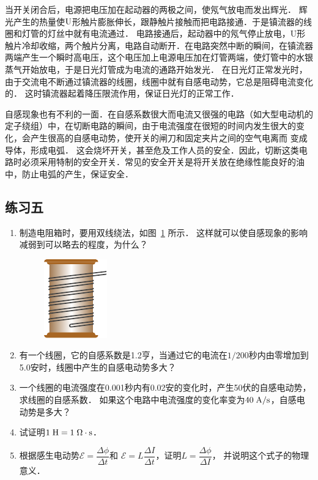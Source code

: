 当开关闭合后，电源把电压加在起动器的两极之间，使氖气放电而发出辉光．
辉光产生的热量使$\rm{U}$形触片膨胀伸长，跟静触片接触而把电路接通．于是镇流器的线圈和灯管的灯丝中就有电流通过．
电路接通后，起动器中的氖气停止放电，U形触片冷却收缩，两个触片分离，电路自动断开．在电路突然中断的瞬间，在镇流器两端产生一个瞬时高电压，这个电压加上电源电压加在灯管两端，使灯管中的水银蒸气开始放电，于是日光灯管成为电流的通路开始发光．
在日光灯正常发光时，由于交流电不断通过镇流器的线圈，线圈中就有自感电动势，它总是阻碍电流变化的．
这时镇流器起着降压限流作用，保证日光灯的正常工作．

自感现象也有不利的一面．在自感系数很大而电流又很强的电路（如大型电动机的定子绕组）中，在切断电路的瞬间，由于电流强度在很短的时间内发生很大的变化，会产生很高的自感电动势，使开关的闸刀和固定夹片之间的空气电离而
变成导体，形成电弧．
这会烧坏开关，甚至危及工作人员的安全．因此，切断这类电路时必须采用特制的安全开关．常见的安全开关是将开关放在绝缘性能良好的油中，防止电弧的产生，保证安全．

\subsection*{练习五}
\begin{enumerate}
    \item 制造电阻箱时，要用双线绕法，如图~\ref{fig_C_2-29} 所示．
    这样就可以使自感现象的影响减弱到可以略去的程度，为什么？
    \begin{figure}[htbp]
        \centering
        \includegraphics{fig/C/2-29.pdf}
        \caption{}\label{fig_C_2-29}
    \end{figure}

    \item 有一个线圈，它的自感系数是1.2亨，当通过它的电流在$1/200$秒内由零增加到5.0安时，线圈中产生的自感电动势多大？
    \item 一个线圈的电流强度在0.001秒内有0.02安的变化时，产生50伏的自感电动势，求线圈的自感系数．
    如果这个电路中电流强度的变化率变为$40 \;\text{A}/\text{s} $，自感电动势是多大？
    \item 试证明$1\;\text{H}=1\;\Omega\cdot\text{s}$．
    \item 根据感生电动势$\mathcal{E}=\dfrac{\Delta \phi}{\Delta t}$和 $\mathcal{E}=L\dfrac{\Delta I}{\Delta t}$，证明$L=\dfrac{\Delta \phi}{\Delta I}$，
    并说明这个式子的物理意义．
\end{enumerate}

